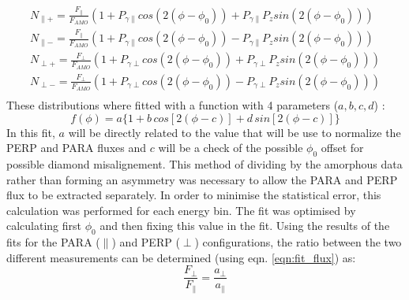 \begin{eqnarray}
N_{\parallel +} = \frac{F_{\parallel}}{F_{AMO}} \left( 1 + P_{\gamma \parallel}cos(2(\phi-\phi_0)) + P_{\gamma \parallel} P_z sin(2(\phi-\phi_0)) \right) \\
N_{\parallel -} = \frac{F_{\parallel}}{F_{AMO}} \left( 1 + P_{\gamma \parallel}cos(2(\phi-\phi_0)) - P_{\gamma \parallel} P_z sin(2(\phi-\phi_0)) \right) \\
N_{\perp +} = \frac{F_{\perp}}{F_{AMO}} \left( 1 + P_{\gamma \perp}cos(2(\phi-\phi_0)) + P_{\gamma \perp} P_z sin(2(\phi-\phi_0)) \right) \\
N_{\perp -} = \frac{F_{\perp}}{F_{AMO}} \left( 1 + P_{\gamma \perp}cos(2(\phi-\phi_0)) - P_{\gamma \perp} P_z sin(2(\phi-\phi_0)) \right) \\
\end{eqnarray}
These distributions where fitted with a function with 4 parameters ($ a,b,c,d $) :
\begin{equation} \label{eqn:fit_flux}
f(\phi) = a \{ 1 + b\, cos[2 (\phi - c) ]  + d\, sin[2(\phi - c)] \} 
\end{equation}
In this fit, $a$ will be directly related to the value that will be use to normalize the PERP and PARA fluxes and $c$ will be a check of the possible $\phi_0$ offset for possible diamond misalignement.
This method of dividing by the amorphous data rather than forming an asymmetry was necessary to allow the PARA and PERP flux to be extracted separately. In order to minimise the statistical error, this calculation was performed for each energy bin. The fit was optimised by calculating first $\phi_0$ and then fixing this value in the fit. 
Using the results of the fits for the PARA ($\parallel$) and PERP ($\perp$) configurations, the ratio between the two different measurements can be determined (using eqn. \ref{eqn:fit_flux}) as:
\begin{equation}
\frac{F_{\perp}}{F_{\parallel}} = \frac{a_{\perp}}{a_{\parallel}}
\end{equation}

